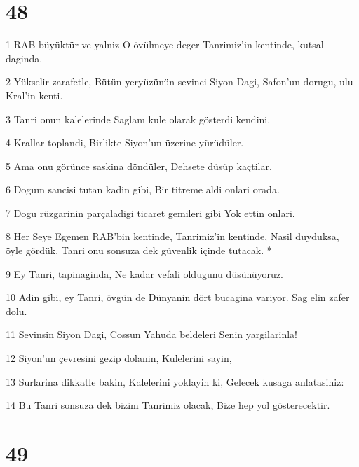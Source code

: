 \chapter{48}

\par 1 RAB büyüktür ve yalniz O övülmeye deger Tanrimiz'in kentinde, kutsal daginda.
\par 2 Yükselir zarafetle, Bütün yeryüzünün sevinci Siyon Dagi, Safon'un dorugu, ulu Kral'in kenti.
\par 3 Tanri onun kalelerinde Saglam kule olarak gösterdi kendini.
\par 4 Krallar toplandi, Birlikte Siyon'un üzerine yürüdüler.
\par 5 Ama onu görünce saskina döndüler, Dehsete düsüp kaçtilar.
\par 6 Dogum sancisi tutan kadin gibi, Bir titreme aldi onlari orada.
\par 7 Dogu rüzgarinin parçaladigi ticaret gemileri gibi Yok ettin onlari.
\par 8 Her Seye Egemen RAB'bin kentinde, Tanrimiz'in kentinde, Nasil duyduksa, öyle gördük. Tanri onu sonsuza dek güvenlik içinde tutacak. *
\par 9 Ey Tanri, tapinaginda, Ne kadar vefali oldugunu düsünüyoruz.
\par 10 Adin gibi, ey Tanri, övgün de Dünyanin dört bucagina variyor. Sag elin zafer dolu.
\par 11 Sevinsin Siyon Dagi, Cossun Yahuda beldeleri Senin yargilarinla!
\par 12 Siyon'un çevresini gezip dolanin, Kulelerini sayin,
\par 13 Surlarina dikkatle bakin, Kalelerini yoklayin ki, Gelecek kusaga anlatasiniz:
\par 14 Bu Tanri sonsuza dek bizim Tanrimiz olacak, Bize hep yol gösterecektir.

\chapter{49}

